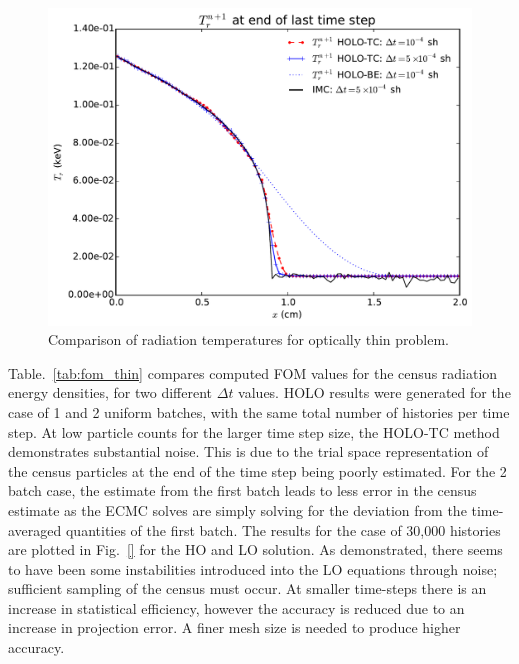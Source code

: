 \documentclass{anstrans}
\begin{document}
\begin{figure}
  \centering
    \includegraphics[width=\linewidth]{thin_temp_compare.pdf}
    \caption{\label{fig:thin_temp_compare} Comparison of radiation temperatures for optically thin
        problem. }
\end{figure}

Table.~\ref{tab:fom_thin} compares computed FOM values for the census
radiation energy densities, for two different $\Delta t$ values.  HOLO results were
generated for the case of 1 and 2 uniform batches, with the same
total number of histories per time step.  At low particle counts for the larger time step
size, the HOLO-TC method
demonstrates substantial noise.  This is due to the trial space representation of the
census particles at the end of the time step being poorly estimated.  For the 2 batch
case, the estimate from the first batch leads to less error in the census estimate as the
ECMC solves are simply solving for the deviation from the time-averaged quantities of the first
batch.  The results for the case of 30,000 histories are plotted in Fig.~\ref{} for the HO and LO
solution.  As demonstrated, there seems to have been some instabilities introduced into the LO
equations through noise; sufficient sampling of the census must occur.  At smaller time-steps there
is an increase in statistical efficiency, however the accuracy is reduced due to an
increase in projection error. A finer mesh size is needed to produce higher accuracy.
\end{document}
